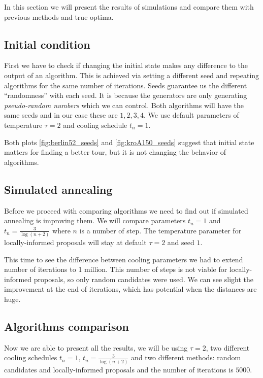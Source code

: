 In this section we will present the results of simulations and compare them with previous methods and true optima.

\subsection{Initial condition}
	First we have to check if changing the initial state makes any difference to the output of an algorithm. This is achieved via setting a different seed and repeating algorithms for the same number of iterations. Seeds guarantee us the different ``randomness'' with each seed. It is because the generators are only generating \textit{pseudo-random numbers} which we can control. Both algorithms will have the same seeds and in our case these are $1,2,3,4$. We use default parameters of temperature $\tau=2$ and cooling schedule $t_n=1$.
	

	Both plots \ref{fig:berlin52_seeds} and \ref{fig:kroA150_seeds} suggest that initial state matters for finding a better tour, but it is not changing the behavior of algorithms.
	
\subsection{Simulated annealing}
	Before we proceed with comparing algorithms we need to find out if simulated annealing is improving them. We will compare parameters $t_n=1$ and $t_n= \frac{3}{\log(n+2)}$ where $n$ is a number of step. The temperature parameter for locally-informed proposals will stay at default $\tau=2$ and seed $1$.
	
	
	
	This time to see the difference between cooling parameters we had to extend number of iterations to 1 million. This number of steps is not viable for locally-informed proposals, so only random candidates were used. We can see slight the improvement at the end of iterations, which has potential when the distances are huge. 
	
\subsection{Algorithms comparison}
	Now we are able to present all the results, we will be using $\tau=2$, two different cooling schedules $t_n=1, \, t_n=\frac{3}{\log(n+2)}$ and two different methods: random candidates and locally-informed proposals and the number of iterations is $5000$.
	
